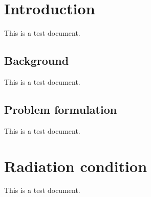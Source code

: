 \documentclass{mythesis}
\begin{document}
\chapter{Introduction}

This is a test document.

\section{Background}

This is a test document.

\section{Problem formulation}

This is a test document.

\chapter{Radiation condition}

This is a test document.
\end{document}
